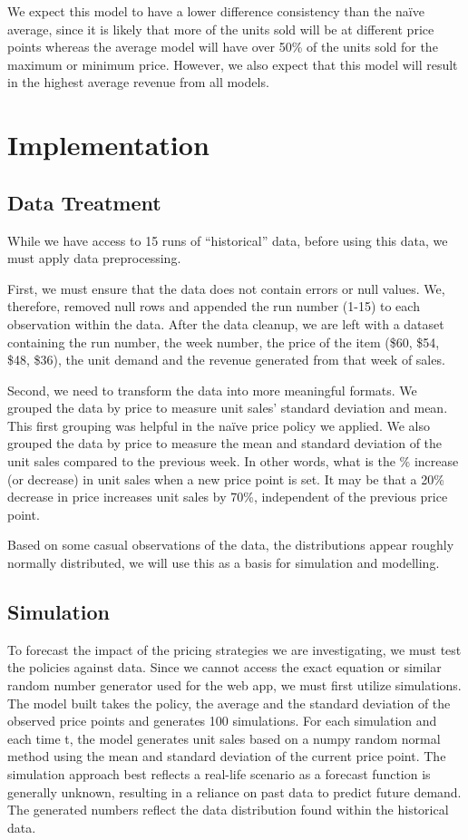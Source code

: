 \documentclass[11pt,a4paper]{article}
\begin{document}
We expect this model to have a lower difference consistency than the naïve average, since it is likely that more of the units sold will be at different price points whereas the average model will have over 50\% of the units sold for the maximum or minimum price. 
However, we also expect that this model will result in the highest average revenue from all models.

\section{Implementation}

\subsection{Data Treatment}
While we have access to 15 runs of “historical” data, before using this data, we must apply data preprocessing. 

First, we must ensure that the data does not contain errors or null values. 
We, therefore, removed null rows and appended the run number (1-15) to each observation within the data. 
After the data cleanup, we are left with a dataset containing the run number, the week number, the price of the item (\$60, \$54, \$48, \$36), the unit demand and the revenue generated from that week of sales. 

Second, we need to transform the data into more meaningful formats. 
We grouped the data by price to measure unit sales’ standard deviation and mean. 
This first grouping was helpful in the naïve price policy we applied. 
We also grouped the data by price to measure the mean and standard deviation of the unit sales compared to the previous week. 
In other words, what is the \% increase (or decrease) in unit sales when a new price point is set. It may be that a 20\% decrease in price increases unit sales by 70\%, independent of the previous price point. 

Based on some casual observations of the data, the distributions appear roughly normally distributed, we will use this as a basis for simulation and modelling. 

\subsection{Simulation}
To forecast the impact of the pricing strategies we are investigating, we must test the policies against data. 
Since we cannot access the exact equation or similar random number generator used for the web app, we must first utilize simulations. 
The model built takes the policy, the average and the standard deviation of the observed price points and generates 100 simulations. 
For each simulation and each time t, the model generates unit sales based on a numpy random normal method using the mean and standard deviation of the current price point. 
The simulation approach best reflects a real-life scenario as a forecast function is generally unknown, resulting in a reliance on past data to predict future demand. 
The generated numbers reflect the data distribution found within the historical data. \\
\end{document}

